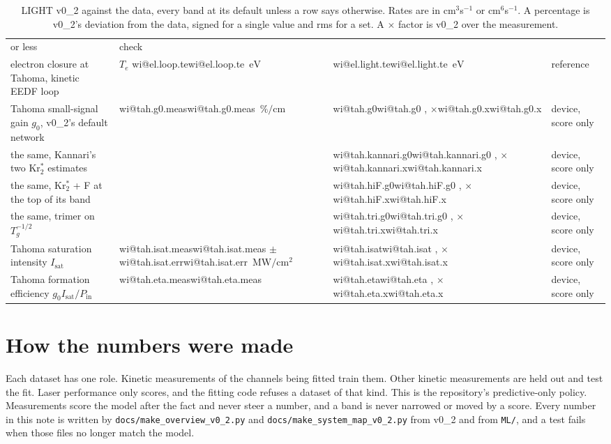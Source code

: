 \documentclass[11pt]{article}
\makeatletter
\newcommand\wi[1]{\ifcsname wi@#1\endcsname\csname wi@#1\endcsname
  \else\errmessage{no overview number '#1'. Rerun make_overview_v0_2.py}\fi}
\newcommand{\unit}[1]{\ensuremath{\,\mathrm{#1}}}
\newcommand{\Krts}{Kr\ensuremath{_2^*}}
\newcommand{\gIP}{\ensuremath{g_0I_\mathrm{sat}/P_\mathrm{in}}}
\newcommand{\x}[1]{\ensuremath{\times}#1}
\makeatother
\begin{document}
\begin{table}[h]
\begin{tabularx}{\linewidth}{@{}>{\raggedright\arraybackslash}X
  >{\raggedright\arraybackslash}p{2.6cm}>{\raggedright\arraybackslash}p{2.5cm}
  >{\raggedright\arraybackslash}p{2.5cm}@{}}
  or less & check\\
electron closure at Tahoma, kinetic EEDF loop & $T_e$ \wi{el.loop.te}\unit{eV}
  & \wi{el.light.te}\unit{eV} & reference\\
\midrule
Tahoma small-signal gain $g_0$, v0\_2's default network &
  \wi{tah.g0.meas}\unit{\%/cm} & \wi{tah.g0}, \x{\wi{tah.g0.x}} & device,
  score only\\
\quad the same, Kannari's two \Krts{} estimates & & \wi{tah.kannari.g0},
  \x{\wi{tah.kannari.x}} & device, score only\\
\quad the same, \Krts{} + F at the top of its band & & \wi{tah.hiF.g0},
  \x{\wi{tah.hiF.x}} & device, score only\\
\quad the same, trimer on $T_g^{-1/2}$ & & \wi{tah.tri.g0},
  \x{\wi{tah.tri.x}} & device, score only\\
Tahoma saturation intensity $I_\mathrm{sat}$ & \wi{tah.isat.meas} $\pm$
  \wi{tah.isat.err}\unit{MW/cm^2} & \wi{tah.isat}, \x{\wi{tah.isat.x}} &
  device, score only\\
Tahoma formation efficiency \gIP & \wi{tah.eta.meas} & \wi{tah.eta},
  \x{\wi{tah.eta.x}} & device, score only\\
\bottomrule
\end{tabularx}
\caption{LIGHT v0\_2 against the data, every band at its default unless a
row says otherwise. Rates are in cm$^3$s$^{-1}$ or cm$^6$s$^{-1}$. A
percentage is v0\_2's deviation from the data, signed for a single value
and rms for a set. A \x{} factor is v0\_2 over the measurement.}
\label{tab:score}
\end{table}

\section{How the numbers were made}

Each dataset has one role. Kinetic measurements of the channels being
fitted train them. Other kinetic measurements are held out and test the
fit. Laser performance only scores, and the fitting code refuses a dataset
of that kind. This is the repository's predictive-only policy. Measurements
score the model after the fact and never steer a number, and a band is
never narrowed or moved by a score. Every number in this note is written
by \texttt{docs/make\_overview\_v0\_2.py} and
\texttt{docs/make\_system\_map\_v0\_2.py} from v0\_2 and from \texttt{ML/},
and a test fails when those files no longer match the model.
\end{document}
